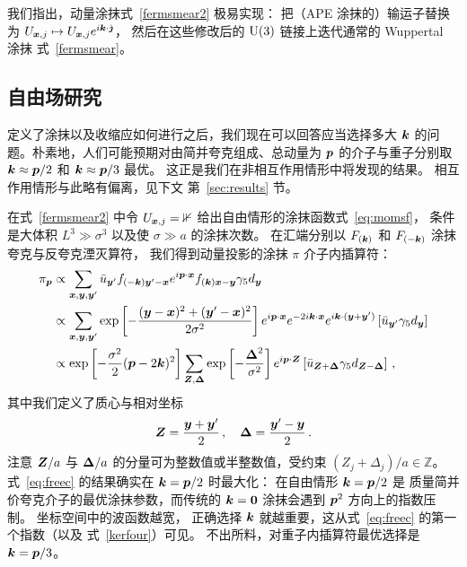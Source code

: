我们指出，动量涂抹式~\eqref{fermsmear2} 极易实现：
把（APE 涂抹的）输运子替换为
$U_{\boldsymbol{x},j}\mapsto U_{\boldsymbol{x},j}e^{i\boldsymbol{k}\cdot\hat{\boldsymbol{\jmath}}}$，
然后在这些修改后的
$\textmd{U}(3)$ 链接上迭代通常的 Wuppertal 涂抹
式~\eqref{fermsmear}。

\subsection{自由场研究}
\label{freefield}
定义了涂抹以及收缩应如何进行之后，我们现在可以回答应当选择多大 $\boldsymbol{k}$
的问题。朴素地，人们可能预期对由简并夸克组成、总动量为
$\boldsymbol{p}$ 的介子与重子分别取 $\boldsymbol{k}\approx \boldsymbol{p}/2$
和 $\boldsymbol{k}\approx\boldsymbol{p}/3$ 最优。
这正是我们在非相互作用情形中将发现的结果。
相互作用情形与此略有偏离，见下文
第~\ref{sec:results} 节。

在式~\eqref{fermsmear2} 中令 $U_{\boldsymbol{x},j}=\mathbb{1}$
给出自由情形的涂抹函数式~\eqref{eq:momsf}，
条件是大体积 $L^3\gg\sigma^3$ 以及使 $\sigma\gg a$ 的涂抹次数。
在汇端分别以 $F_{(\boldsymbol{k})}$
和 $F_{(-\boldsymbol{k})}$ 涂抹夸克与反夸克湮灭算符，
我们得到动量投影的涂抹 $\pi$ 介子内插算符：
\begin{align}
\pi_{\boldsymbol{p}}&\propto
\sum_{\boldsymbol{x}, \boldsymbol{y},\boldsymbol{y}^{\prime}}
\bar{u}_{\boldsymbol{y}'}f_{(-\boldsymbol{k})\boldsymbol{y}'-\boldsymbol{x}} e^{i\boldsymbol{p}\cdot\boldsymbol{x}}
f_{(\boldsymbol{k})\boldsymbol{x}-\boldsymbol{y}}\gamma_5d_{\boldsymbol{y}}\nonumber\\
&\propto\sum_{\boldsymbol{x}, \boldsymbol{y},\boldsymbol{y}^{\prime}}\exp\left[-\frac{(\boldsymbol{y}-\boldsymbol{x})^2+(\boldsymbol{y}'-\boldsymbol{x})^2}{2\sigma^2}\right]
 e^{i\boldsymbol{p}\cdot\boldsymbol{x}}e^{-2i\boldsymbol{k}\cdot\boldsymbol{x}} e^{i\boldsymbol{k}\cdot(\boldsymbol{y}+\boldsymbol{y}^{\prime})} \left[\bar{u}_{\boldsymbol{y}^{\prime}} \gamma_5 d_{\boldsymbol{y}}\right]\label{eq:freec}\\\nonumber
&\propto \exp\left[-\frac{\sigma^2}{2}(\boldsymbol{p}-2 \boldsymbol{k})^2\right]
\sum_{\boldsymbol{Z},\boldsymbol{\Delta}}
\exp\left[-\frac{\boldsymbol{\Delta}^2}{\sigma^2}\right]
e^{i\boldsymbol{p}\cdot \boldsymbol{Z}} \left[\bar{u}_{\boldsymbol{Z}+\boldsymbol{\Delta}} \gamma_5 d_{\boldsymbol{Z}-\boldsymbol{\Delta}}\right]\,,
\end{align}
其中我们定义了质心与相对坐标
\begin{align}
\boldsymbol{Z} = \frac{\boldsymbol{y}+\boldsymbol{y}^{\prime}}{2}\,,\quad
\boldsymbol{\Delta} =\frac{\boldsymbol{y}^{\prime}-\boldsymbol{y}}{2}\,.
\end{align}
注意 $\boldsymbol{Z}/a$ 与 $\boldsymbol{\Delta}/a$
的分量可为整数值或半整数值，受约束
$(Z_j+\Delta_j)/a\in\mathbb{Z}$。
式~\eqref{eq:freec} 的结果确实在
$\boldsymbol{k}=\boldsymbol{p}/2$ 时最大化：
在自由情形 $\boldsymbol{k}=\boldsymbol{p}/2$ 是
质量简并价夸克介子的最优涂抹参数，而传统的
$\boldsymbol{k}=\boldsymbol{0}$ 涂抹会遇到 $\boldsymbol{p}^2$ 方向上的指数压制。
坐标空间中的波函数越宽，
正确选择 $\boldsymbol{k}$ 就越重要，这从式~\eqref{eq:freec} 的第一个指数（以及
式~\eqref{kerfour}）可见。
不出所料，对重子内插算符最优选择是
$\boldsymbol{k}=\boldsymbol{p}/3$。

